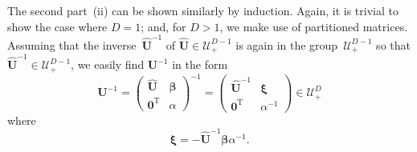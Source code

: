 \documentclass[12pt,a4paper]{article}
\begin{document}
The second part~(ii) can be shown similarly by induction.
Again, it is trivial to show the case where $D = 1$; and,
for $D > 1$, we make use of partitioned matrices.
Assuming that the inverse~$\widehat{\mathbf{U}}^{-1}$ of
$\widehat{\mathbf{U}} \in \mathcal{U}_{+}^{D - 1}$ is again in the group~$\mathcal{U}_{+}^{D - 1}$
so that $\widehat{\mathbf{U}}^{-1} \in \mathcal{U}_{+}^{D - 1}$,
we easily find $\mathbf{U}^{-1}$ in the form
\begin{equation}
\mathbf{U}^{-1} =
\begin{pmatrix}
\widehat{\mathbf{U}} & \bm{\beta} \\
\mathbf{0}^{\operatorname{T}} & \alpha
\end{pmatrix}^{-1} =
\begin{pmatrix}
\widehat{\mathbf{U}}^{-1} & \bm{\xi} \\
\mathbf{0}^{\operatorname{T}} & \alpha^{-1}
\end{pmatrix} \in \mathcal{U}_{+}^{D}
\end{equation}
where
\begin{equation}
\bm{\xi} = -\widehat{\mathbf{U}}^{-1} \bm{\beta} \alpha^{-1} .
\end{equation}
\end{document}
